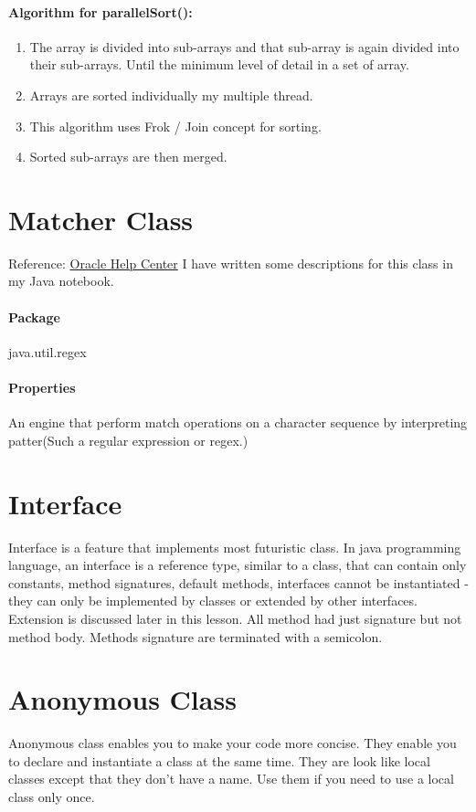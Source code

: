 \documentclass[10 pt]{book}
\begin{document}
\paragraph{Algorithm for parallelSort():}
	\begin{enumerate}
		\item The array is divided into sub-arrays and that sub-array is again divided into their sub-arrays. Until the minimum level of detail in a set of array.
		\item Arrays are sorted individually my multiple thread.
		\item This algorithm uses Frok / Join concept for sorting.
		\item Sorted sub-arrays are then merged.
	\end{enumerate}

\section{Matcher Class}
Reference: \href{https://docs.oracle.com/javase/7/docs/api/java/util/regex/Matcher.html}{Oracle Help Center}\linebreak
I have written some descriptions for this class in my Java notebook.

\paragraph{Package}
java.util.regex
\paragraph{Properties}
An engine that perform match operations on a character sequence by interpreting patter(Such a regular expression or regex.)

\section{Interface}
Interface is a feature that implements most futuristic class. In java programming language, an interface is a reference type, similar to a class, that can contain only constants, method signatures, default methods, interfaces cannot be instantiated - they can only be implemented by classes or extended by other interfaces. Extension is discussed later in this lesson. All method had just signature but not method body. Methods signature are terminated with a semicolon.

\section{Anonymous Class}
Anonymous class enables you to make your code more concise. They enable you to declare and instantiate a class at the same time. They are look like local classes except that they don't have a name.\hfill
Use them if you need to use a local class only once.
\end{document}
